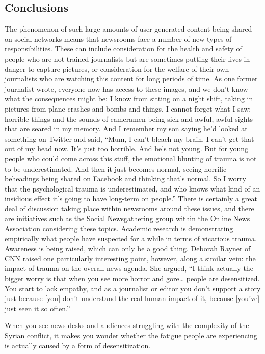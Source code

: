 \begin{enumerate}
\section{Conclusions}
The phenomenon of such large amounts of user-generated content being
shared on social networks means that newsrooms face a number of new
types of responsibilities. These can include consideration for the health and
safety of people who are not trained journalists but are sometimes putting
their lives in danger to capture pictures, or consideration for the welfare of
their own journalists who are watching this content for long periods of time.
As one former journalist wrote, everyone now has access to these images,
and we don't know what the consequences might be:
I know from sitting on a night shift, taking in pictures from plane
crashes and bombs and things, I cannot forget what I saw; horrible
things and the sounds of cameramen being sick and awful, awful
sights that are seared in my memory. And I remember my son saying
he'd looked at something on Twitter and said, ``Mum, I can't bleach
my brain. I can't get that out of my head now. It's just too horrible.
And he's not young. But for young people who could come across
this stuff, the emotional blunting of trauma is not to be underestimated.
And then it just becomes normal, seeing horrific beheadings
being shared on Facebook and thinking that's normal. So I worry that
the psychological trauma is underestimated, and who knows what
kind of an insidious effect it's going to have long-term on people.''
There is certainly a great deal of discussion taking place within newsrooms
around these issues, and there are initiatives such as the Social Newsgathering
group within the Online News Association considering these topics.
Academic research is demonstrating empirically what people have suspected
for a while in terms of vicarious trauma. Awareness is being raised,
which can only be a good thing.
Deborah Rayner of CNN raised one particularly interesting point, however,
along a similar vein: the impact of trauma on the overall news agenda. She
argued, ``I think actually the bigger worry is that when you see more horror
and gore… people are desensitized. You start to lack empathy, and as a
journalist or editor you don't support a story just because [you] don't understand
the real human impact of it, because [you've] just seen it so often.''

When you see news desks and audiences struggling with the complexity
of the Syrian conflict, it makes you wonder whether the fatigue people are
experiencing is actually caused by a form of desensitization.


\end{enumerate}
